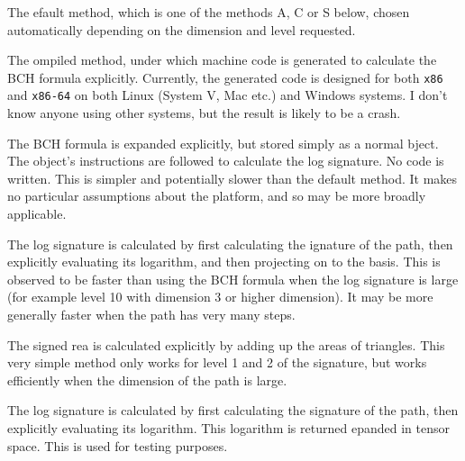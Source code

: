 \documentclass[a4paper]{extarticle}
\begin{document}
\begin{description}[leftmargin=1in,itemindent=0in,labelwidth=0.3in,
labelsep=0.3in,labelindent=0.4in]
\item[D] The efault method, which is one of the methods A, C or S below, chosen automatically depending on the dimension and level requested.
\item[C] The ompiled method, under which machine code is generated to calculate the BCH formula explicitly. Currently, the generated code is designed for both \verb|x86| and \verb|x86-64| on both Linux (System V, Mac etc.) and Windows systems. I don't know anyone using other systems, but the result is likely to be a crash.
\item[O] The BCH formula is expanded explicitly, but stored simply as a normal bject. The object's instructions are followed to calculate the log signature. No code is written. This is simpler and potentially slower than the default method. It makes no particular assumptions about the platform, and so may be more broadly applicable. 
\item[S] The log signature is calculated by first calculating the ignature of the path, then explicitly evaluating its logarithm, and then projecting on to the basis.%
This is observed to be faster than using the BCH formula when the log signature is large (for example level 10 with dimension 3 or higher dimension). It may be more generally faster when the path has very many steps.
\item[A] The signed rea is calculated explicitly by adding up the areas of triangles. This very simple method only works for level 1 and 2 of the signature, but works efficiently when the dimension of the path is large.
\item[X] The log signature is calculated by first calculating the signature of the path, then explicitly evaluating its logarithm. This logarithm is returned epanded in tensor space. This is used for testing purposes.
\end{description}
\end{document}
